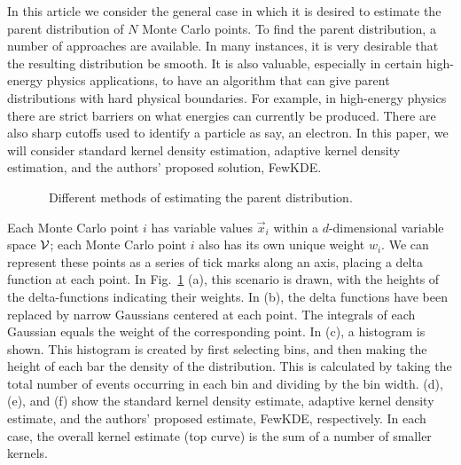 \documentclass[prd,twocolumn]{revtex4}
\def\nMC{N}
\begin{document}
 In this article we consider the general case in which it is desired to estimate the parent distribution of $\nMC$ Monte Carlo points.  To find the parent distribution, a number of approaches are available.  In many instances, it is very desirable that the resulting distribution be smooth.  It is also valuable, especially in certain high-energy physics applications, to have an algorithm that can give parent distributions with hard physical boundaries.  For example, in high-energy physics there are strict barriers on what energies can currently be produced.  There are also sharp cutoffs used to identify a particle as say, an electron.  In this paper, we will consider standard kernel density estimation, adaptive kernel density estimation, and the authors' proposed solution, FewKDE.  

\begin{figure}
\label{fig:VariousEstimators}
\caption{\ Different methods of estimating the parent distribution.}
\end{figure}

Each Monte Carlo point $i$ has variable values $\vec{x}_i$ within a $d$-dimensional variable space ${\cal V}$; each Monte Carlo point $i$ also has its own unique weight $w_i$.  We can represent these points as a series of tick marks along an axis, placing a delta function at each point.  In Fig.~\ref{fig:VariousEstimators} (a), this scenario is drawn, with the heights of the delta-functions indicating their weights.  In (b), the delta functions have been replaced by narrow Gaussians centered at each point.  The integrals of each Gaussian equals the weight of the corresponding point.  In (c), a histogram is shown.  This histogram is created by first selecting bins, and then making the height of each bar the density of the distribution.  This is calculated by taking the total number of events occurring in each bin and dividing by the bin width. (d), (e), and (f) show the standard kernel density estimate, adaptive kernel density estimate, and the authors' proposed estimate, FewKDE, respectively.  In each case, the overall kernel estimate (top curve) is the sum of a number of smaller kernels.
\end{document}
